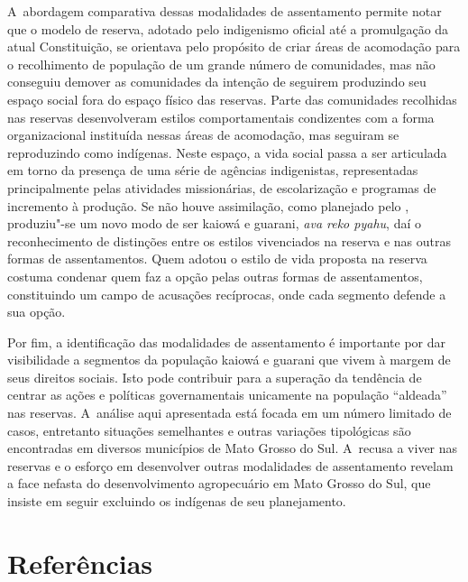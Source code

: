 A~abordagem comparativa dessas modalidades de assentamento permite notar
que o modelo de reserva, adotado pelo indigenismo oficial até a
promulgação da atual Constituição, se orientava pelo propósito de criar
áreas de acomodação para o recolhimento de população de um grande
número de comunidades, mas não conseguiu demover as comunidades da
intenção de seguirem produzindo seu espaço social fora do espaço físico
das reservas. Parte das comunidades recolhidas nas reservas
desenvolveram estilos comportamentais condizentes com a forma
organizacional instituída nessas áreas de acomodação, mas seguiram se
reproduzindo como indígenas. Neste espaço, a vida social passa a ser
articulada em torno da presença de uma série de agências indigenistas,
representadas principalmente pelas atividades missionárias, de
escolarização e programas de incremento à produção. Se não houve
assimilação, como planejado pelo , produziu"-se um novo modo de ser
kaiowá e guarani, \emph{ava reko pyahu}, daí o reconhecimento de distinções
entre os estilos vivenciados na reserva e nas outras formas de
assentamentos. Quem adotou o estilo de vida proposta na reserva costuma
condenar quem faz a opção pelas outras formas de assentamentos,
constituindo um campo de acusações recíprocas, onde cada segmento
defende a sua opção.

Por fim, a identificação das modalidades de assentamento é importante
por dar visibilidade a segmentos da população kaiowá e guarani que
vivem à margem de seus direitos sociais. Isto pode contribuir para a
superação da tendência de centrar as ações e políticas governamentais
unicamente na população ``aldeada'' nas reservas. A~análise aqui
apresentada está focada em um número limitado de casos, entretanto
situações semelhantes e outras variações tipológicas são encontradas em
diversos municípios de Mato Grosso do Sul. A~recusa a viver nas
reservas e o esforço em desenvolver outras modalidades de assentamento
revelam a face nefasta do desenvolvimento agropecuário em Mato Grosso
do Sul, que insiste em seguir excluindo os indígenas de seu
planejamento.

\section{Referências}

